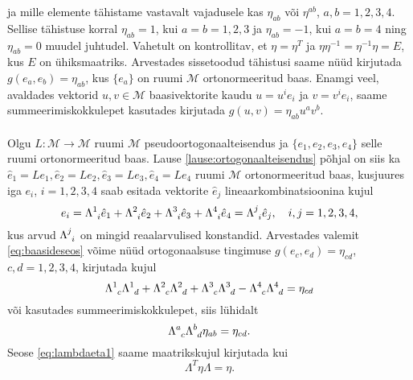 \documentclass[a4paper,12pt]{article}
\theoremstyle{plain}
\theoremstyle{definition}
\numberwithin{equation}{section}
\begin{document}
ja mille elemente tähistame vastavalt vajadusele kas $\eta_{ab}$ või $\eta^{ab}$, $a, b = 1, 2, 3, 4$. Sellise tähistuse korral $\eta_{ab} = 1$, kui $a = b = 1, 2, 3$ ja $\eta_{ab} = -1$, kui $a = b = 4$ ning $\eta_{ab} = 0$ muudel juhtudel. Vahetult on kontrollitav, et $\eta = \eta^T$ ja $\eta \eta^{-1} = \eta^{-1} \eta = E$, kus $E$ on ühiksmaatriks.
\newline
Arvestades sissetoodud tähistusi saame nüüd kirjutada $g\left(e_a, e_b\right) = \eta_{ab}$, kus $\{e_a\}$ on ruumi $\mathcal{M}$ ortonormeeritud baas. Enamgi veel, avaldades vektorid $u, v \in \mathcal{M}$ baasivektorite kaudu $u = u^i e_i$ ja $v = v^i e_i$, saame summeerimiskokkulepet kasutades kirjutada $g \left(u, v\right) = \eta_{ab} u^a v^b$.

\paragraph{} Olgu $L : \mathcal{M} \rightarrow \mathcal{M}$ ruumi $\mathcal{M}$ pseudoortogonaalteisendus ja $\{e_1, e_2, e_3, e_4\}$ selle ruumi ortonormeeritud baas. Lause \ref{lause:ortogonaalteisendus} põhjal on siis ka $\hat{e}_1 = Le_1, \hat{e}_2  = Le_2, \hat{e}_3 = Le_3, \hat{e}_4 = Le_4$ ruumi $\mathcal{M}$ ortonormeeritud baas, kusjuures iga $e_i$, $i = 1,2,3,4$ saab esitada vektorite $\hat{e}_j$ lineaarkombinatsioonina kujul
\begin{equation} \label{eq:baasideseos}
e_i = \Lambda\indices{^1_i} \hat{e}_1 + \Lambda\indices{^2_i} \hat{e}_2 + \Lambda\indices{^3_i} \hat{e}_3 + \Lambda\indices{^4_i} \hat{e}_4 = \Lambda\indices{^j_i} \hat{e}_j, \quad i,j = 1, 2, 3, 4,
\end{equation}
kus arvud $\Lambda\indices{^j_i}$ on mingid reaalarvulised konstandid. Arvestades valemit \ref{eq:baasideseos} võime nüüd ortogonaalsuse tingimuse $g \left(e_c, e_d\right) = \eta_{cd}$, $c, d = 1, 2, 3, 4$, kirjutada kujul
\begin{equation*}
\Lambda\indices{^1_c} \Lambda\indices{^1_d} + \Lambda\indices{^2_c} \Lambda\indices{^2_d} + \Lambda\indices{^3_c} \Lambda\indices{^3_d} - \Lambda\indices{^4_c} \Lambda\indices{^4_d} = \eta_{cd}
\end{equation*}
või kasutades summeerimiskokkulepet, siis lühidalt
\begin{equation} \label{eq:lambdaeta1}
\Lambda\indices{^a_c} \Lambda\indices{^b_d} \eta_{ab} = \eta_{cd}.
\end{equation}
Seose \ref{eq:lambdaeta1} saame maatrikskujul kirjutada kui
\begin{equation} \label{eq:lambdaetamat1}
\Lambda^T \eta \Lambda = \eta.
\end{equation}
\end{document}
